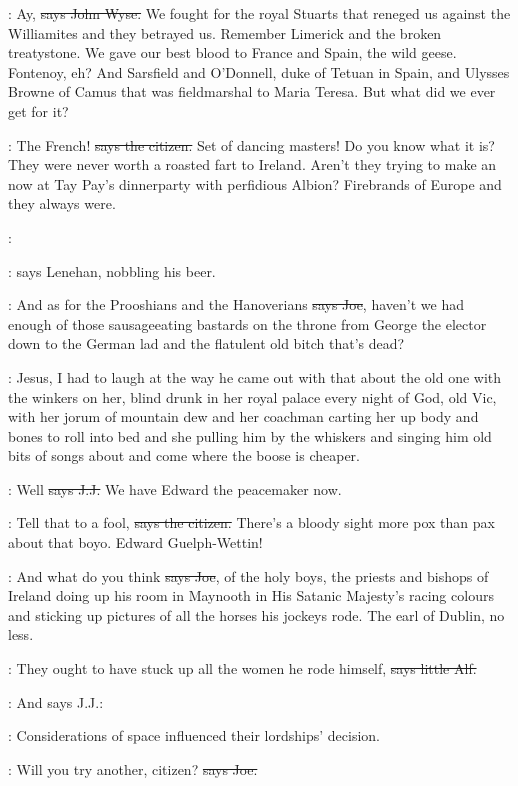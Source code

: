 \johnwyse:
Ay,
\sout{says John Wyse.}
We fought for the royal Stuarts that reneged us
against the Williamites and they betrayed us.
Remember Limerick and the broken treatystone.
We gave our best blood to France and Spain,
the wild geese.
Fontenoy,
eh?
And Sarsfield and O'Donnell,
duke of Tetuan in Spain,
and Ulysses Browne of Camus that was fieldmarshal to Maria Teresa.
But what did we ever get for it?

\citizen:
The French!
\sout{says the citizen.}
Set of dancing masters!
Do you know what it is?
They were never worth a roasted fart to Ireland.
Aren't they trying to make an  now
at Tay Pay's dinnerparty with perfidious Albion?
Firebrands of Europe and they always were.

\lenehan:

\Nq:
says Lenehan,
nobbling his beer.

\joe:
And as for the Prooshians and the Hanoverians
\sout{says Joe},
haven't we had enough of those sausageeating bastards on the throne
from George the elector
down to the German lad
and the flatulent old bitch that's dead?

\Nq:
Jesus,
I had to laugh at the way he came out with that
about the old one with the winkers on her,
blind drunk in her royal palace every night of God,
old Vic,
with her jorum of mountain dew
and her coachman carting her up
body and bones
to roll into bed
and she pulling him by the whiskers
and singing him old bits of songs about 
and come where the boose is cheaper.

\jjom:
Well
\sout{says J.J.}
We have Edward the peacemaker now.

\citizen:
Tell that to a fool,
\sout{says the citizen.}
There's a bloody sight more pox than pax about that boyo.
Edward Guelph-Wettin!

\joe:
And what do you think
\sout{says Joe},
of the holy boys,
the priests and bishops of Ireland doing up his room in Maynooth
in His Satanic Majesty's racing colours
and sticking up pictures of all the horses his jockeys rode.
The earl of Dublin,
no less.

\bergan:
They ought to have stuck up all the women he rode himself,
\sout{says little Alf.}

\Nq:
And says J.J.:

\jjom:
Considerations of space influenced their lordships' decision.

\joe:
Will you try another,
citizen?
\sout{says Joe.}

